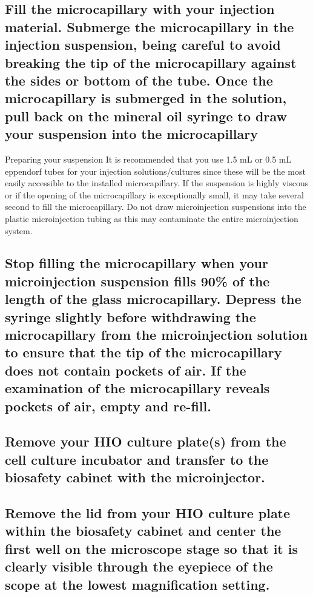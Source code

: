 \documentclass[11pt]{article}
\begin{document}
\subsection{{\bfseries\sffamily } Fill the microcapillary with your injection material. Submerge the microcapillary in the injection suspension, being careful to avoid breaking the tip of the microcapillary against the sides or bottom of the tube. Once the microcapillary is submerged in the solution, pull back on the mineral oil syringe to draw your suspension into the microcapillary}
\label{sec:orgheadline43}
\begin{bclogo}[logo=\bcinfo, couleurBarre=Black, noborder=true, couleur=gray!10]{     Preparing your suspension}
It is recommended that you use 1.5 mL or 0.5 mL eppendorf tubes for your injection solutions/cultures since these will be the most easily accessible to the installed microcapillary. If the suspension is highly viscous or if the opening of the microcapillary is exceptionally small, it may take several second to fill the microcapillary. Do not draw microinjection suspensions into the plastic microinjection tubing as this may contaminate the entire microinjection system.\\
\end{bclogo}

\subsection{{\bfseries\sffamily } Stop filling the microcapillary when your microinjection suspension fills 90\% of the length of the glass microcapillary. Depress the syringe slightly before withdrawing the microcapillary from the microinjection solution to ensure that the tip of the microcapillary does not contain pockets of air. If the examination of the microcapillary reveals pockets of air, empty and re-fill.}
\label{sec:orgheadline44}
\subsection{{\bfseries\sffamily } Remove your HIO culture plate(s) from the cell culture incubator and transfer to the biosafety cabinet with the microinjector.}
\label{sec:orgheadline45}
\subsection{{\bfseries\sffamily } Remove the lid from your HIO culture plate within the biosafety cabinet and center the first well on the microscope stage so that it is clearly visible through the eyepiece of the scope at the lowest magnification setting.}
\label{sec:orgheadline46}
\end{document}
